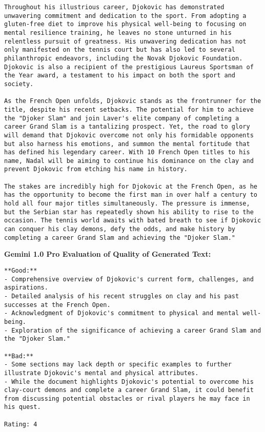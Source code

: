 \begin{lstlisting}
Throughout his illustrious career, Djokovic has demonstrated unwavering commitment and dedication to the sport. From adopting a gluten-free diet to improve his physical well-being to focusing on mental resilience training, he leaves no stone unturned in his relentless pursuit of greatness. His unwavering dedication has not only manifested on the tennis court but has also led to several philanthropic endeavors, including the Novak Djokovic Foundation. Djokovic is also a recipient of the prestigious Laureus Sportsman of the Year award, a testament to his impact on both the sport and society.

As the French Open unfolds, Djokovic stands as the frontrunner for the title, despite his recent setbacks. The potential for him to achieve the "Djoker Slam" and join Laver's elite company of completing a career Grand Slam is a tantalizing prospect. Yet, the road to glory will demand that Djokovic overcome not only his formidable opponents but also harness his emotions, and summon the mental fortitude that has defined his legendary career. With 10 French Open titles to his name, Nadal will be aiming to continue his dominance on the clay and prevent Djokovic from etching his name in history.

The stakes are incredibly high for Djokovic at the French Open, as he has the opportunity to become the first man in over half a century to hold all four major titles simultaneously. The pressure is immense, but the Serbian star has repeatedly shown his ability to rise to the occasion. The tennis world awaits with bated breath to see if Djokovic can conquer his clay demons, defy the odds, and make history by completing a career Grand Slam and achieving the "Djoker Slam."
\end{lstlisting}


{\bf\ttfamily Gemini 1.0 Pro Evaluation of Quality of Generated Text:}
\begin{lstlisting}
**Good:**
- Comprehensive overview of Djokovic's current form, challenges, and aspirations.
- Detailed analysis of his recent struggles on clay and his past successes at the French Open.
- Acknowledgment of Djokovic's commitment to physical and mental well-being.
- Exploration of the significance of achieving a career Grand Slam and the "Djoker Slam."

**Bad:**
- Some sections may lack depth or specific examples to further illustrate Djokovic's mental and physical attributes.
- While the document highlights Djokovic's potential to overcome his clay-court demons and complete a career Grand Slam, it could benefit from discussing potential obstacles or rival players he may face in his quest.

Rating: 4
\end{lstlisting}


